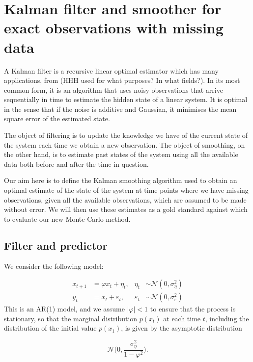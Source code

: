 \documentclass[11pt,a4paper]{article}
\begin{document}
\section{Kalman filter and smoother for exact observations with missing data}

A Kalman filter is a recursive linear optimal estimator {\color{blue} which has many applications, from }{\color{red} (HHH used for what purposes? In what fields?)}. In its most common form, it is an algorithm that uses noisy observations that arrive sequentially in time to estimate the hidden state of a linear system. It is optimal in the sense that if the noise is additive and Gaussian, it minimises the mean square error of the estimated state.

The object of filtering is to update the knowledge we have of the current state of the system each time we obtain a new observation. The object of smoothing, on the other hand, is to estimate past states of the system using all the available data both before and after the time in question.

Our aim here is to define the Kalman smoothing algorithm used to obtain an optimal estimate of the state of the system at time points where we have missing observations, given all the available observations, which are assumed to be made without error. We will then use these estimates as a gold standard against which to evaluate our new Monte Carlo method. 

\subsection{Filter and predictor}

We consider the following model:

\begin{align*}
    x_{t+1} &= \varphi x_t + \eta_t, & \eta_t &\sim \mathcal{N}(0,\sigma^2_\eta) \\
    y_t &= x_t + \varepsilon_t, & \varepsilon_t &\sim \mathcal{N}(0,\sigma^2_\varepsilon)
\end{align*}
This is an AR(1) model, and we assume $|\varphi| < 1$ {\color{blue} to ensure that the process is stationary}, so that the marginal distribution $p(x_t)$ at each time $t$, including the distribution of the initial value $p(x_{1})$, is given by the asymptotic distribution

\begin{equation} \label{eq:1}
      \mathcal{N} \Bigg (0, \frac{\sigma_\eta^2}{1- \varphi^2} \Bigg).
\end{equation}
  
\end{document}
